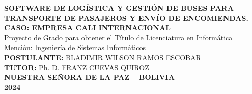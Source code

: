 \begin{titlepage}
\begin{center}
    {\textbf{SOFTWARE DE LOGÍSTICA Y GESTIÓN DE BUSES PARA TRANSPORTE DE PASAJEROS Y ENVÍO DE ENCOMIENDAS. CASO: EMPRESA CALI INTERNACIONAL}}\\
    {Proyecto de Grado para obtener el Título de Licenciatura en Informática}\\
    Mención: Ingeniería de Sistemas Informáticos\\

    \textbf{POSTULANTE:} BLADIMIR WILSON RAMOS ESCOBAR\\
    \textbf{TUTOR:} Ph. D. FRANZ CUEVAS QUIROZ\\
    \textbf{NUESTRA SEÑORA DE LA PAZ – BOLIVIA}\\
    \textbf{2024}\\
  \end{center}
\end{titlepage}